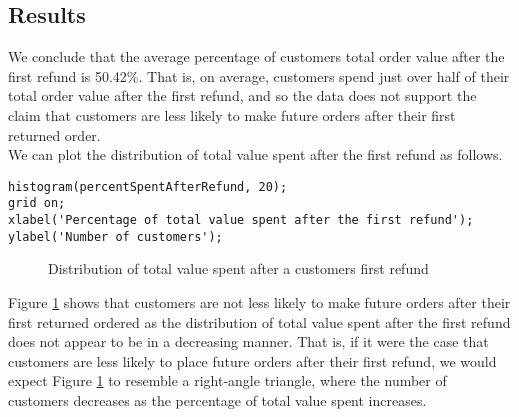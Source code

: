 \newpage
\subsection{Results}

We conclude that the average percentage of customers total order value after the first refund is 50.42\%. That is, on average, customers spend just over half of their total order value after the first refund, and so the data does not support the claim that customers are less likely to make future orders after their first returned order. \\

\noindent
We can plot the distribution of total value spent after the first refund as follows.
\begin{lstlisting}
histogram(percentSpentAfterRefund, 20);
grid on;
xlabel('Percentage of total value spent after the first refund');
ylabel('Number of customers');
\end{lstlisting}

\begin{figure}[h]
  \centering
  \caption{Distribution of total value spent after a customers first refund}
  \label{fig:histogram}
\end{figure}

\noindent
Figure \ref{fig:histogram} shows that customers are not less likely to make future orders after their first returned ordered as the distribution of total value spent after the first refund does not appear to be in a decreasing manner. That is, if it were the case that customers are less likely to place future orders after their first refund, we would expect Figure \ref{fig:histogram} to resemble a right-angle triangle, where the number of customers decreases as the percentage of total value spent increases.
